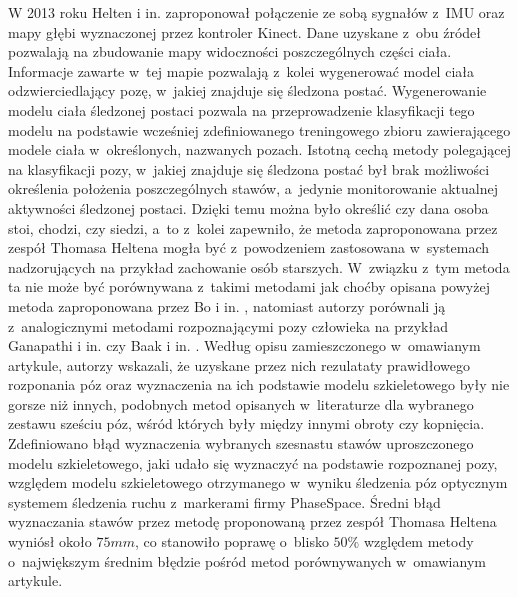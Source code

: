 W 2013 roku Helten i in. \cite{Helten2013} zaproponował połączenie ze sobą sygnałów z~IMU oraz mapy głębi wyznaczonej przez kontroler Kinect. Dane uzyskane z~obu źródeł pozwalają na zbudowanie mapy widoczności poszczególnych części ciała. Informacje zawarte w~tej mapie pozwalają z~kolei wygenerować model ciała odzwierciedlający pozę, w~jakiej znajduje się śledzona postać. Wygenerowanie modelu ciała śledzonej postaci pozwala na przeprowadzenie klasyfikacji tego modelu na podstawie wcześniej zdefiniowanego treningowego zbioru zawierającego modele ciała w~określonych, nazwanych pozach. Istotną cechą metody polegającej na klasyfikacji pozy, w~jakiej znajduje się śledzona postać był brak możliwości określenia położenia poszczególnych stawów, a~jedynie monitorowanie aktualnej aktywności śledzonej postaci. Dzięki temu można było określić czy dana osoba stoi, chodzi, czy siedzi, a~to z~kolei zapewniło, że metoda zaproponowana przez zespół Thomasa Heltena mogła być z~powodzeniem zastosowana w~systemach nadzorujących na przykład zachowanie osób starszych. W~związku z~tym metoda ta nie może być porównywana z~takimi metodami jak choćby opisana powyżej metoda zaproponowana przez Bo i in. \cite{Bo2011a}, natomiast autorzy porównali ją z~analogicznymi metodami rozpoznającymi pozy człowieka na przykład Ganapathi i in. \cite{Ganapathi2010} czy Baak i in. \cite{Baak2011}. Według opisu zamieszczonego w~omawianym artykule, autorzy wskazali, że uzyskane przez nich rezulataty prawidłowego rozponania póz oraz wyznaczenia na ich podstawie modelu szkieletowego były nie gorsze niż innych, podobnych metod opisanych w~literaturze dla wybranego zestawu sześciu póz, wśród których były między innymi obroty czy kopnięcia. Zdefiniowano błąd wyznaczenia wybranych szesnastu stawów uproszczonego modelu szkieletowego, jaki udało się wyznaczyć na podstawie rozpoznanej pozy, względem modelu szkieletowego otrzymanego w~wyniku śledzenia póz optycznym systemem śledzenia ruchu z~markerami firmy PhaseSpace. Średni błąd wyznaczania stawów przez metodę proponowaną przez zespół Thomasa Heltena wyniósł około $75mm$, co stanowiło poprawę o~blisko $50\%$ względem metody o~największym średnim błędzie pośród metod porównywanych w~omawianym artykule.

